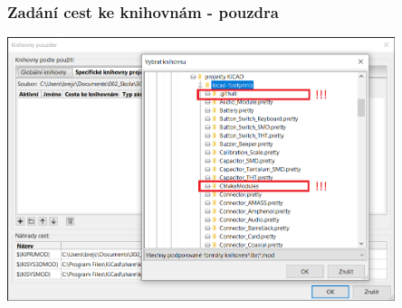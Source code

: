\documentclass{beamer}
\begin{document}
\begin{frame}
	\frametitle{Zadání cest ke knihovnám - pouzdra}

		\begin{center}
			\includegraphics[width=0.85\textwidth]{obr/knihovny08.png}
		\end{center}
		
\end{frame}

\end{document}
